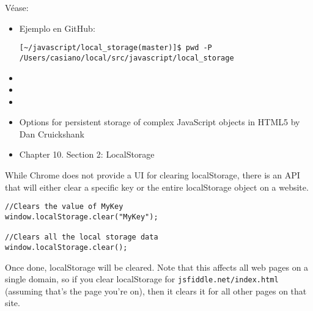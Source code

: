 Véase:
\begin{itemize}
\item
Ejemplo en  GitHub:
\begin{verbatim}
[~/javascript/local_storage(master)]$ pwd -P
/Users/casiano/local/src/javascript/local_storage
\end{verbatim}
\item 
{}

\item 
{}
\item
{}
\item
{}
Options for persistent storage of complex JavaScript objects in HTML5
by Dan Cruickshank
\item
{}
Chapter 10. Section 2: LocalStorage
\end{itemize}

While Chrome does not provide a UI for clearing localStorage, there is an API that will either clear a specific key or the entire localStorage object on a website.

\begin{verbatim}
//Clears the value of MyKey
window.localStorage.clear("MyKey");

//Clears all the local storage data
window.localStorage.clear();
\end{verbatim}
Once done, localStorage will be cleared. Note that this affects
all web pages on a single domain, so if you clear localStorage for
\verb|jsfiddle.net/index.html| (assuming that's the page you're on), then it
clears it for all other pages on that site. 


